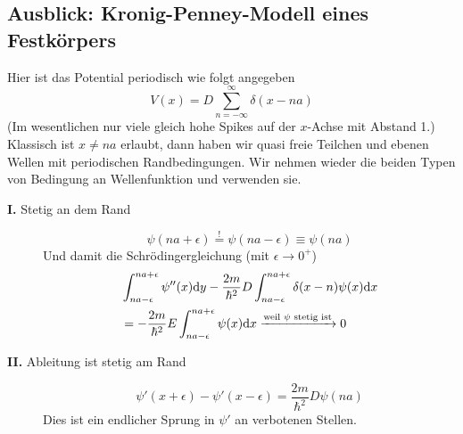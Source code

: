 \subsection{Ausblick: Kronig-Penney-Modell eines Festkörpers}
Hier ist das Potential periodisch wie folgt angegeben
$$V(x) = D \sum_{n = -\infty}^{\infty} \delta(x - n a)$$
(Im wesentlichen nur viele gleich hohe Spikes auf der $x$-Achse mit Abstand 1.)\\
Klassisch ist $x \neq n a$ erlaubt, dann haben wir quasi freie Teilchen und ebenen Wellen mit periodischen Randbedingungen. Wir nehmen wieder die beiden Typen von Bedingung an Wellenfunktion und verwenden sie.
\begin{description}
	\item[\textbf{I.} Stetig an dem Rand]
	$$\psi(n a + \epsilon) \overset!= \psi(na - \epsilon) \equiv \psi(na)$$
	Und damit die Schrödingergleichung (mit $\epsilon \to 0^+$)
	\begin{align*}
	&\int_{na-\epsilon}^{na + \epsilon} \psi''(x) \mathrm d y - \frac{2m}{\hbar^2} D \int_{na - \epsilon}^{na + \epsilon} \delta(x - n) \psi(x) \mathrm d x\\
	&= - \frac{2m}{\hbar^2} E \int_{na - \epsilon}^{na + \epsilon} \psi(x) \mathrm d x \xrightarrow{\text{weil $\psi$ stetig ist}} 0
	\end{align*}
	\item[\textbf{II.} Ableitung ist stetig am Rand]
	$$\psi'(x +\epsilon) - \psi'(x -\epsilon) = \frac{2m}{\hbar^2} D \psi(n a)$$
	Dies ist ein endlicher Sprung in $\psi'$ an verbotenen Stellen.
\end{description}


